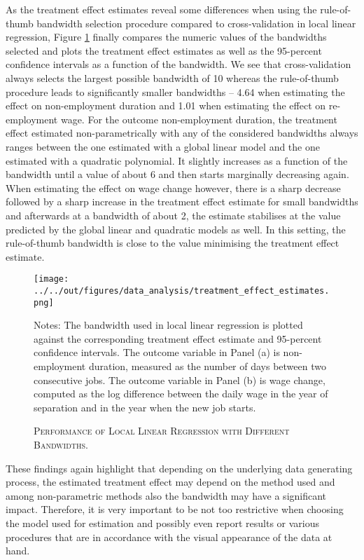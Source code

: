 \documentclass[11pt, a4paper, leqno]{article}
\numberwithin{equation}{section}
\numberwithin{figure}{section}
\numberwithin{table}{section}
\numberwithin{algorithm}{section}
\begin{document}
As the treatment effect estimates reveal some differences when using the rule-of-thumb bandwidth selection procedure compared to cross-validation in local linear regression, Figure \ref{fig: bw_perf} finally compares the numeric values of the bandwidths selected and plots the treatment effect estimates as well as the 95-percent confidence intervals as a function of the bandwidth. We see that cross-validation always selects the largest possible bandwidth of 10 whereas the rule-of-thumb procedure leads to significantly smaller bandwidths -- 4.64 when estimating the effect on non-employment duration and 1.01 when estimating the effect on re-employment wage. For the outcome non-employment duration, the treatment effect estimated non-parametrically with any of the considered bandwidths always ranges between the one estimated with a global linear model and the one estimated with a quadratic polynomial. It slightly increases as a function of the bandwidth until a value of about 6 and then starts marginally decreasing again. When estimating the effect on wage change however, there is a sharp decrease followed by a sharp increase in the treatment effect estimate for small bandwidths and afterwards at a bandwidth of about 2, the estimate stabilises at the value predicted by the global linear and quadratic models as well. In this setting, the rule-of-thumb bandwidth is close to the value minimising the treatment effect estimate.

\begin{figure}[H]
	\centering
	\texttt{[image: ../../out/figures/data\_analysis/treatment\_effect\_estimates.png]}
	\caption{\textsc{Performance of Local Linear Regression with Different Bandwidths.}}
	\label{fig: bw_perf}
	\medskip
	\justify
	\footnotesize{Notes: The bandwidth used in local linear regression is plotted against the corresponding treatment effect estimate and 95-percent confidence intervals. The outcome variable in Panel (a) is non-employment duration, measured as the number of days between two consecutive jobs. The outcome variable in Panel (b) is wage change, computed as the log difference between the daily wage in the year of separation and in the year when the new job starts.}
\end{figure}

These findings again highlight that depending on the underlying data generating process, the estimated treatment effect may depend on the method used and among non-parametric methods also the bandwidth may have a significant impact. Therefore, it is very important to be not too restrictive when choosing the model used for estimation and possibly even report results or various procedures that are in accordance with the visual appearance of the data at hand.
\end{document}
